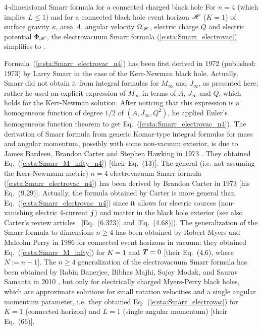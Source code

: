 \begin{tprop}{4-dimensional Smarr formula for a connected charged black hole}{}
For $n=4$ (which implies $L\leq 1$) and for a connected black hole event horizon
$\mathscr{H}$ ($K=1$) of surface gravity $\kappa$, area $A$, angular velocity
$\Omega_{\mathscr{H}}$, electric charge $Q$ and electric potential $\Phi_{\mathscr{H}}$,
the electrovacuum Smarr formula
(\ref{e:sta:Smarr_electrovac}) simplifies to
\be \label{e:sta:Smarr_electrovac_n4}
    .
\ee
\end{tprop}

\begin{hist}
Formula~(\ref{e:sta:Smarr_electrovac_n4}) has been first derived in 1972 (published: 1973)
by Larry Smarr
\cite{Smarr73} in the case of the Kerr-Newman black hole.
Actually, Smarr did not obtain it from integral formulas for $M_\infty$ and $J_\infty$,
as presented here; rather he used an explicit expression of $M_\infty$ in terms
of $A$, $J_\infty$ and $Q$, which holds for the Kerr-Newman solution.
After noticing that this expression is a homogeneous function of degree $1/2$
of $(A,J_\infty,Q^2)$, he applied Euler's homogeneous function theorem to get
Eq.~(\ref{e:sta:Smarr_electrovac_n4}). The derivation of Smarr formula
from generic Komar-type integral formulas for mass and angular momentum,
possibly with some non-vacuum exterior,
is due to James Bardeen, Brandon Carter
and Stephen Hawking in 1973 \cite{BardeCH73}. They obtained
Eq.~(\ref{e:sta:Smarr_M_infty_n4}) [their Eq.~(13)].
The general (i.e. not assuming the Kerr-Newmann metric)
$n=4$ electrovacuum Smarr formula (\ref{e:sta:Smarr_electrovac_n4}) has
been derived by Brandon Carter in 1973 \cite{Carte73b} [his Eq.~(9.29)].
Actually, the formula obtained by Carter is more general than Eq.~(\ref{e:sta:Smarr_electrovac_n4})
since it allows for electric sources (non-vanishing electric 4-current $\bm{j}$) and matter in the black hole exterior (see also Carter's review articles~\cite{Carte79c} [Eq.~(6.323)]
and \cite{Carte87} [Eq.~(4.68)]).
The generalization of the Smarr formula to dimensions $n \geq 4$ has been
obtained by Robert Myers and Malcolm Perry
in 1986 \cite{MyersP86}
for connected event horizons in vacuum: they obtained Eq.~(\ref{e:sta:Smarr_M_infty})
for $K=1$ and $\bm{T}=0$ [their Eq.~(4.6), where $N := n - 1$].
The $n \geq 4$ generalization of the electrovacuum Smarr formula has been obtained
by Rabin Banerjee, Bibhas Majhi, Sujoy Modak, and Saurav Samanta
in 2010 \cite{BanerMMS10}, but only for electrically charged Myers-Perry black holes,
which are approximate solutions for small rotation velocities and a single angular momentum
parameter,
i.e. they obtained Eq.~(\ref{e:sta:Smarr_electrovac}) for $K=1$ (connected horizon)
and $L=1$ (single angular momentum) [their Eq.~(66)].
\end{hist}

